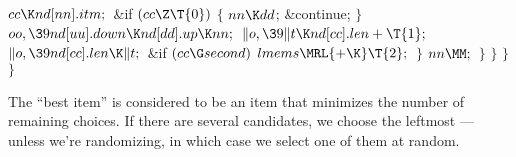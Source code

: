 ${}\\{cc}\K\\{nd}[\\{nn}].\\{itm};{}$\6
\&{if} ${}(\\{cc}\Z\T{0}){}$\5
${}\{{}$\1\6
${}\\{nn}\K\\{dd}{}$;\5
\&{continue};\6
\4${}\}{}$\2\6
${}\\{oo},\39\\{nd}[\\{uu}].\\{down}\K\\{nd}[\\{dd}].\\{up}\K\\{nn};{}$\6
${}\|o,\39\|t\K\\{nd}[\\{cc}].\\{len}+\T{1};{}$\6
${}\|o,\39\\{nd}[\\{cc}].\\{len}\K\|t;{}$\6
\&{if} ${}(\\{cc}\G\\{second}){}$\1\5
${}\\{lmems}\MRL{+{\K}}\T{2};{}$\2\6
\4${}\}{}$\2\6
${}\\{nn}\MM;{}$\6
\4${}\}{}$\2\6
\4${}\}{}$\2\6
\4${}\}{}$\2\6
\4${}\}{}$\2\par
\fi

The ``best item'' is considered to be an item that minimizes the
number of remaining choices. If there are several candidates, we
choose the leftmost --- unless we're randomizing, in which case we
select one of them at random.

